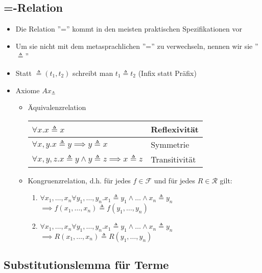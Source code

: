 \documentclass{scrartcl}
\begin{document}
\pagebreak
\subsection{=-Relation}

\begin{itemize}
	\item Die Relation ''='' kommt in den meisten praktischen Spezifikationen vor
	\item Um sie nicht mit dem metasprachlichen ''='' zu verwechseln, nennen wir sie ''$ \triangleq $''
	\item Statt $ \triangleq(t_1,t_2) $ schreibt man $ t_1 \triangleq t_2 $ (Infix statt Präfix)
	\item Axiome $ Ax_\triangleq $
	\begin{itemize}
		\item Äquivalenzrelation \\
		\renewcommand{\arraystretch}{2}
		\begin{tabular}{l|l}
			$ \forall x.x \triangleq x $ & Reflexivität \\ 
			\hline 
			$ \forall x,y.x \triangleq y \implies y \triangleq x $ & Symmetrie \\ 
			\hline 
			$ \forall x,y,z.x \triangleq y \wedge y \triangleq z \implies x \triangleq z $ & Transitivität
		\end{tabular} 
		\item Kongruenzrelation, d.h. für jedes $ f \in \mathcal{F} $ und für jedes $ R \in \mathcal{R} $ gilt:
		\begin{enumerate}\addtocounter{enumi}{3}
			\item $ \forall x_1,\ldots,x_n \forall y_1,\ldots,y_n.x_1 \triangleq y_1 \wedge \ldots \wedge x_n \triangleq y_n $ \\
			$ \implies f(x_1,\ldots,x_n) \triangleq f(y_1,\ldots,y_n) $
			\item $ \forall x_1,\ldots,x_n \forall y_1,\ldots,y_n.x_1 \triangleq y_1 \wedge \ldots \wedge x_n \triangleq y_n $ \\
			$ \implies R(x_1,\ldots,x_n) \triangleq R(y_1,\ldots,y_n) $
		\end{enumerate}
	\end{itemize}
\end{itemize}

\subsection{Substitutionslemma für Terme}
\end{document}

